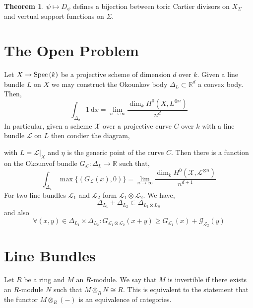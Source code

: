 \documentclass[12pt]{extarticle}
\newcommand{\R}{\mathbb{R}}
\theoremstyle{definition}
\newtheorem{theorem}{Theorem}[section]
\newenvironment{definition}[1][Definition:]{\begin{trivlist}
\item[\hskip \labelsep {\bfseries #1}]}{\end{trivlist}}
\newcommand{\G}{\mathcal{G}}
\renewcommand{\d}[1]{\mathrm{d} #1}
\begin{document}
\begin{theorem}
$\psi \mapsto D_\psi$ defines a bijection between toric Cartier divisors on $X_\Sigma$ and vertual support functions on $\Sigma$. 
\end{theorem}

\section{The Open Problem}

Let $X \to \mathrm{Spec}\left( k \right)$ be a projective scheme of dimension $d$ over $k$. Given a line bundle $L$ on $X$ we may construct the Okounkov body $\Delta_L \subset \R^d$ a convex body. Then,
\[ \int_{\Delta_d} 1
\:  \d{x} = \lim_{n \to \infty} \frac{\dim_k H^0(X, L^{\otimes n})}{n^d} \]
In particular, given a scheme $\mathcal{X}$ over a projective curve $C$ over $k$ with a line bundle $\mathcal{L}$ on $L$ then condier the diagram,
\begin{center}
\end{center}
with $L = \mathcal{L}|_X$ and $\eta$ is the generic point of the curve $C$. Then there is a function on the Okounvof bundle $G_{\mathcal{L}} : \Delta_L \to \R$ such that,
\[ \int_{\Delta_L} \max\{(G_{\mathcal{L}}(x), 0)\} = \lim_{n \to \infty} \frac{\dim_k H^0(\mathcal{X}, \mathcal{L}^{\otimes n})}{n^{d+1}} \]
For two line bundles $\mathcal{L}_1$ and $\mathcal{L}_2$ form $\mathcal{L}_1 \otimes \mathcal{L}_2$. We have,
\[ \Delta_{L_1} + \Delta_{L_2} \subset \Delta_{L_1 \otimes L_@} \]
and also
\[ \forall (x, y) \in \Delta_{L_1} \times \Delta_{L_2} : G_{\mathcal{L}_1 \otimes \mathcal{L}_2}(x + y) \ge G_{\mathcal{L}_1}(x) + \G_{\mathcal{L}_2}(y) \] 

\section{Line Bundles}

\begin{definition}
Let $R$ be a ring and $M$ an $R$-module. We say that $M$ is invertible if there exists an $R$-module $N$ such that $M \otimes_R N \cong R$. This is equivalent to the statement that the functor $M \otimes_R (-)$ is an equivalence of categories. 
\end{definition}
\end{document}
